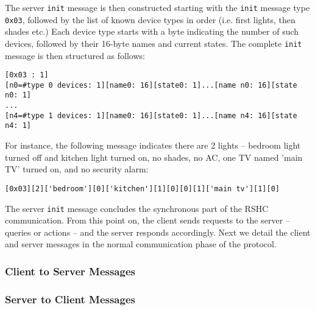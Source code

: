 \noindent
The server {\tt init} message is then constructed starting with the {\tt init} message type {\tt 0x03}, followed by the list of known device types in order (i.e. first lights, then shades etc.) Each device type starts with a byte indicating the number of such devices, followed by their 16-byte names and current states. The complete {\tt init} message is then structured as follows:

\begin{verbatim}
[0x03 : 1]
[n0=#type 0 devices: 1][name0: 16][state0: 1]...[name n0: 16][state n0: 1]
...
[n4=#type 1 devices: 1][name0: 16][state0: 1]...[name n4: 16][state n4: 1]
\end{verbatim}

\noindent
For instance, the following message indicates there are 2 lights -- bedroom light turned off and kitchen light turned on, no shades, no AC, one TV named 'main TV' turned on, and no security alarm:

\begin{verbatim}
[0x03][2]['bedroom'][0]['kitchen'][1][0][0][1]['main tv'][1][0]
\end{verbatim}

\noindent
The server {\tt init} message concludes the synchronous part of the RSHC communication. From this point on, the client sends requests to the server -- queries or actions -- and the server responds accordingly. Next we detail the client and server messages in the normal communication phase of the protocol.


\subsubsection{Client to Server Messages}
\label{sec:pdus:pdu:c_to_s}



\subsubsection{Server to Client Messages}
\label{sec:pdus:pdu:s_to_c}



\begin{verbatim}

\end{verbatim}
